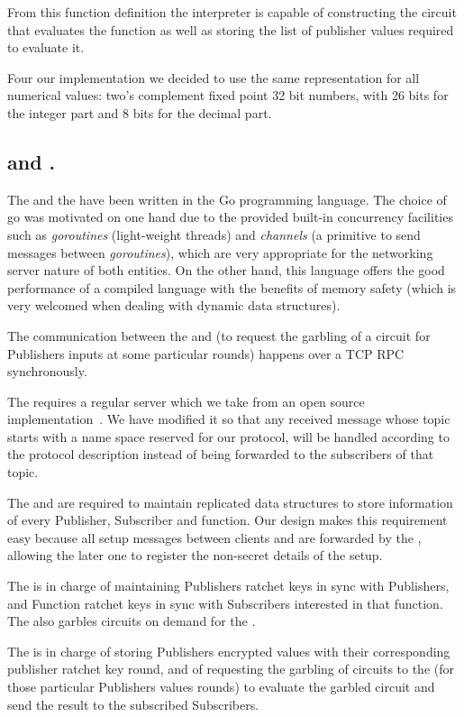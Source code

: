 From this function definition the interpreter is capable of constructing the
circuit that evaluates the function as well as storing the list of publisher
values required to evaluate it.

Four our implementation we decided to use the same representation for all
numerical values: two's complement fixed point 32 bit numbers, with 26 bits for
the integer part and 8 bits for the decimal part.

\subsection{\broker and \garbler.}

The \broker and the \garbler have been written in the Go programming
language.  The choice of go was motivated on one hand due to the provided
built-in concurrency facilities such as \emph{goroutines} (light-weight
threads) and \emph{channels} (a primitive to send messages between
\emph{goroutines}), which are very appropriate for the networking server nature
of both entities.  On the other hand, this language offers the good performance
of a compiled language with the benefits of memory safety (which is very
welcomed when dealing with dynamic data structures).

The communication between the \broker and \garbler (to request the garbling
of a circuit for Publishers inputs at some particular rounds) happens over a
TCP RPC synchronously.

The \broker requires a regular \MQTT{} \broker server which we take from an
open source implementation~\cite{mqttgo}.  We have modified it so that any
received message whose topic starts with a name space reserved for our
protocol, will be handled according to the protocol description instead of
being forwarded to the subscribers of that topic.

The \broker and \garbler are required to maintain replicated data structures
to store information of every Publisher, Subscriber and function.  Our design
makes this requirement easy because all setup messages between clients and
\garbler are forwarded by the \broker, allowing the later one to register the
non-secret details of the setup.

The \garbler is in charge of maintaining Publishers ratchet keys in sync
with Publishers, and Function ratchet keys in sync with Subscribers interested
in that function.  The \garbler also garbles circuits on demand for the
\broker.

The \broker is in charge of storing Publishers encrypted values with their
corresponding publisher ratchet key round, and of requesting the garbling of
circuits to the \garbler (for those particular Publishers values rounds) to
evaluate the garbled circuit and send the result to the subscribed Subscribers.

